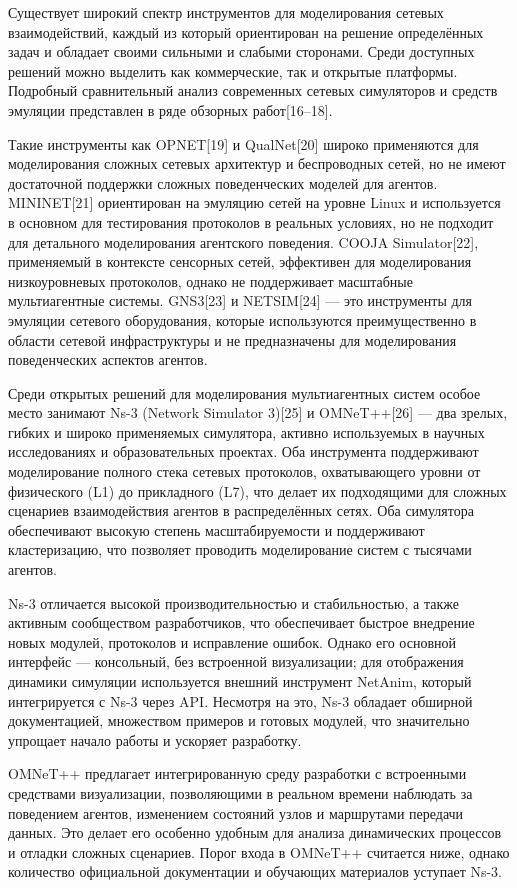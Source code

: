 Существует широкий спектр инструментов для моделирования сетевых
взаимодействий, каждый из который ориентирован на решение определённых
задач и обладает своими сильными и слабыми сторонами. Среди доступных
решений можно выделить как коммерческие, так и открытые платформы.
Подробный сравнительный анализ современных сетевых симуляторов и средств
эмуляции представлен в ряде обзорных работ{[}16--18{]}.

Такие инструменты как OPNET{[}19{]} и QualNet{[}20{]} широко применяются
для моделирования сложных сетевых архитектур и беспроводных сетей, но не
имеют достаточной поддержки сложных поведенческих моделей для агентов.
MININET{[}21{]} ориентирован на эмуляцию сетей на уровне Linux и
используется в основном для тестирования протоколов в реальных условиях,
но не подходит для детального моделирования агентского поведения. COOJA
Simulator{[}22{]}, применяемый в контексте сенсорных сетей, эффективен
для моделирования низкоуровневых протоколов, однако не поддерживает
масштабные мультиагентные системы. GNS3{[}23{]} и NETSIM{[}24{]} --- это
инструменты для эмуляции сетевого оборудования, которые используются
преимущественно в области сетевой инфраструктуры и не предназначены для
моделирования поведенческих аспектов агентов.

Среди открытых решений для моделирования мультиагентных систем особое
место занимают Ns-3 (Network Simulator 3){[}25{]} и OMNeT++{[}26{]} ---
два зрелых, гибких и широко применяемых симулятора, активно используемых
в научных исследованиях и образовательных проектах. Оба инструмента
поддерживают моделирование полного стека сетевых протоколов,
охватывающего уровни от физического (L1) до прикладного (L7), что делает
их подходящими для сложных сценариев взаимодействия агентов в
распределённых сетях. Оба симулятора обеспечивают высокую степень
масштабируемости и поддерживают кластеризацию, что позволяет проводить
моделирование систем с тысячами агентов.

Ns-3 отличается высокой производительностью и стабильностью, а также
активным сообществом разработчиков, что обеспечивает быстрое внедрение
новых модулей, протоколов и исправление ошибок. Однако его основной
интерфейс --- консольный, без встроенной визуализации; для отображения
динамики симуляции используется внешний инструмент NetAnim, который
интегрируется с Ns-3 через API. Несмотря на это, Ns-3 обладает обширной
документацией, множеством примеров и готовых модулей, что значительно
упрощает начало работы и ускоряет разработку.

OMNeT++ предлагает интегрированную среду разработки с встроенными
средствами визуализации, позволяющими в реальном времени наблюдать за
поведением агентов, изменением состояний узлов и маршрутами передачи
данных. Это делает его особенно удобным для анализа динамических
процессов и отладки сложных сценариев. Порог входа в OMNeT++ считается
ниже, однако количество официальной документации и обучающих материалов
уступает Ns-3.

